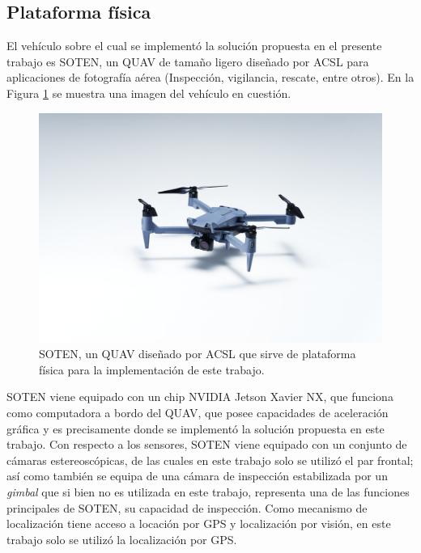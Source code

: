 \subsection{Plataforma física}

El vehículo sobre el cual se implementó la solución propuesta en el presente trabajo es SOTEN, un QUAV de tamaño ligero diseñado por ACSL para aplicaciones de fotografía aérea (Inspección, vigilancia, rescate, entre otros). En la Figura \ref{fig:SOTEN} se muestra una imagen del vehículo en cuestión.

\begin{figure}[H]
    \centering
    \includegraphics[scale=0.13]{partes/img/SOTEN.jpg}
    \caption[SOTEN, un QUAV diseñado por ACSL que sirve de plataforma física para la implementación de este trabajo.]{SOTEN, un QUAV diseñado por ACSL que sirve de plataforma física para la implementación de este trabajo.}
    \label{fig:SOTEN}
\end{figure}

SOTEN viene equipado con un chip NVIDIA Jetson Xavier NX, que funciona como computadora a bordo del QUAV, que posee capacidades de aceleración gráfica y es precisamente donde se implementó la solución propuesta en este trabajo. Con respecto a los sensores, SOTEN viene equipado con un conjunto de cámaras estereoscópicas, de las cuales en este trabajo solo se utilizó el par frontal; así como también se equipa de una cámara de inspección estabilizada por un \textit{gimbal} que si bien no es utilizada en este trabajo, representa una de las funciones principales de SOTEN, su capacidad de inspección. Como mecanismo de localización tiene acceso a locación por GPS y localización por visión, en este trabajo solo se utilizó la localización por GPS. 


